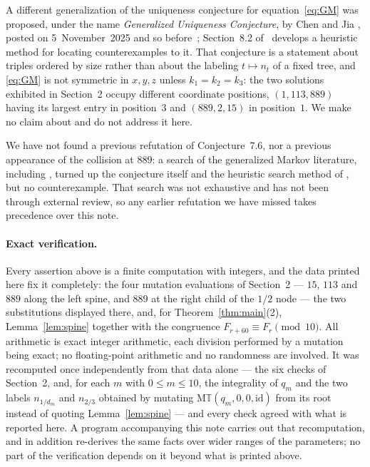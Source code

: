 \documentclass[11pt]{amsart}
\newcommand{\GMT}{\mathrm{M}\mathbb{T}}
\newcommand{\id}{\mathrm{id}}
\begin{document}
A different generalization of the uniqueness conjecture for
equation~\eqref{eq:GM} was proposed, under the name \emph{Generalized
Uniqueness Conjecture}, by Chen and Jia \cite[Conjecture~8.2]{ChenJia}, posted
on 5~November~2025 and so before~\cite{Gyoda}; Section~8.2 of~\cite{ChenJia}
develops a heuristic method for locating counterexamples to it. That
conjecture is a statement about triples ordered by size rather than about the
labeling $t\mapsto n_t$ of a fixed tree, and \eqref{eq:GM} is not symmetric in
$x,y,z$ unless $k_1=k_2=k_3$: the two solutions exhibited in Section~2 occupy
different coordinate positions, $(1,113,889)$ having its largest entry in
position~$3$ and $(889,2,15)$ in position~$1$. We make no claim about
\cite[Conjecture~8.2]{ChenJia} and do not address it here.

We have not found a previous refutation of Conjecture~7.6, nor a
previous appearance of the collision at $889$: a search of the generalized
Markov literature, including \cite{ChenJia,Gyoda,GyodaMatsushita}, turned up
the conjecture itself and the heuristic search method of
\cite[Section~8.2]{ChenJia}, but no counterexample. That search was not
exhaustive and has not been through external review, so any earlier refutation
we have missed takes precedence over this note.

\paragraph{Exact verification.}
Every assertion above is a finite computation with integers, and the data
printed here fix it completely: the four mutation evaluations of Section~2 ---
$15$, $113$ and $889$ along the left spine, and $889$ at the right child of the
$1/2$ node --- the two substitutions displayed there, and, for
Theorem~\ref{thm:main}(2), Lemma~\ref{lem:spine} together with the congruence
$F_{r+60}\equiv F_r\pmod{10}$. All arithmetic is exact integer arithmetic, each
division performed by a mutation being exact; no floating-point arithmetic and no
randomness are involved. It was recomputed once independently from that data
alone --- the six checks of Section~2, and, for each $m$ with $0\le m\le10$, the
integrality of $q_m$ and the two labels $n_{1/d_m}$ and $n_{2/3}$ obtained by
mutating $\GMT(q_m,0,0,\id)$ from its root instead of quoting
Lemma~\ref{lem:spine} --- and every check agreed with what is reported here. A
program accompanying this note carries out that recomputation, and in addition
re-derives the same facts over wider ranges of the parameters; no part of the
verification depends on it beyond what is printed above.
\end{document}
